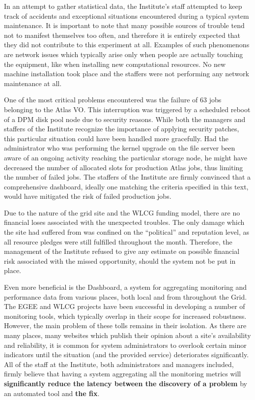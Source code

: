 \documentclass[12pt]{article}
\begin{document}
In an attempt to gather statistical data, the Institute's staff attempted to keep track of accidents and exceptional situations
encountered during a typical system maintenance.  It is important to note that many possible sources of trouble tend not to
manifest themselves too often, and therefore it is entirely expected that they did not contribute to this experiment at all.
Examples of such phenomenons are network issues which typically arise only when people are actually touching the equipment, like
when installing new computational resources.  No new machine installation took place and the staffers were not performing any
network maintenance at all.

One of the most critical problems encountered was the failure of 63 jobs belonging to the Atlas VO.  This interruption was
triggered by a scheduled reboot of a DPM disk pool node due to security reasons.  While both the managers and staffers of the
Institute recognize the importance of applying security patches, this particular situation could have been handled more
gracefully.  Had the administrator who was performing the kernel upgrade on the file server been aware of an ongoing activity
reaching the particular storage node, he might have decreased the number of allocated slots for production Atlas jobs, thus
limiting the number of failed jobs.  The staffers of the Institute are firmly convinced that a comprehensive dashboard, ideally
one matching the criteria specified in this text, would have mitigated the risk of failed production jobs.

Due to the nature of the grid site and the WLCG funding model, there are no financial loses associated with the unexpected
troubles.  The only damage which the site had suffered from was confined on the ``political'' and reputation level, as all
resource pledges were still fulfilled throughout the month.  Therefore, the management of the Institute refused to give any
estimate on possible financial risk associated with the missed opportunity, should the system not be put in place.

Even more beneficial is the Dashboard, a system for aggregating monitoring and performance data from various places, both local
and from throughout the Grid.  The EGEE and WLCG projects have been successful in developing a number of monitoring tools, which
typically overlap in their scope for increased robustness.  However, the main problem of these tolls remains in their isolation.
As there are many places, many websites which publish their opinion about a site's availability and reliability, it is common for
system administrators to overlook certain minor indicators until the situation (and the provided service) deteriorates
significantly.  All of the staff at the Institute, both administrators and managers included, firmly believe that having a system
aggregating all the monitoring metrics will {\bf significantly reduce the latency between the discovery of a problem} by an
automated tool and {\bf the fix}.
\end{document}
